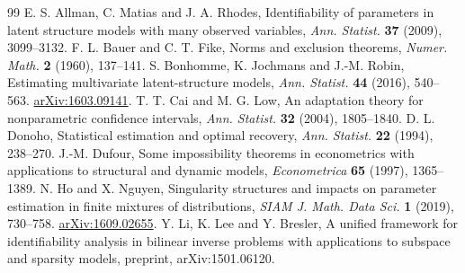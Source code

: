 \documentclass[11pt,reqno]{amsart}
\numberwithin{equation}{section}
\theoremstyle{definition}\newtheorem{definition}[theorem]{Definition}
\theoremstyle{remark}\newtheorem{remark}[theorem]{Remark}
\begin{document}
\begin{thebibliography}{99}
 E. S. Allman, C. Matias and J. A. Rhodes,
Identifiability of parameters in latent structure models with many
observed variables, \emph{Ann. Statist.} \textbf{37} (2009), 3099--3132.
 F. L. Bauer and C. T. Fike,
Norms and exclusion theorems, \emph{Numer. Math.} \textbf{2} (1960), 137--141.
 S. Bonhomme, K. Jochmans and J.-M. Robin,
Estimating multivariate latent-structure models,
\emph{Ann. Statist.} \textbf{44} (2016), 540--563.
\href{https://arxiv.org/abs/1603.09141}{arXiv:1603.09141}.
 T. T. Cai and M. G. Low,
An adaptation theory for nonparametric confidence intervals,
\emph{Ann. Statist.} \textbf{32} (2004), 1805--1840.
 D. L. Donoho, Statistical estimation and optimal recovery,
\emph{Ann. Statist.} \textbf{22} (1994), 238--270.
 J.-M. Dufour, Some impossibility theorems in econometrics
with applications to structural and dynamic models,
\emph{Econometrica} \textbf{65} (1997), 1365--1389.
 N. Ho and X. Nguyen, Singularity structures and impacts on
parameter estimation in finite mixtures of distributions,
\emph{SIAM J. Math. Data Sci.} \textbf{1} (2019), 730--758.
\href{https://arxiv.org/abs/1609.02655}{arXiv:1609.02655}.
 Y. Li, K. Lee and Y. Bresler,
A unified framework for identifiability analysis in bilinear inverse
problems with applications to subspace and sparsity models,
preprint, arXiv:1501.06120.
\end{thebibliography}
\end{document}

